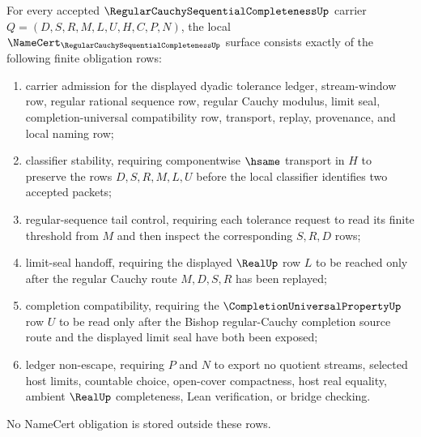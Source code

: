 \begin{theorem}
\label{thm:regular-cauchy-sequential-completeness-namecert-obligations}
For every accepted $\RegularCauchySequentialCompletenessUp$ carrier $Q=(D,S,R,M,L,U,H,C,P,N)$, the local $\NameCert_{\RegularCauchySequentialCompletenessUp}$ surface consists exactly of the following finite obligation rows:
\begin{enumerate}
\item carrier admission for the displayed dyadic tolerance ledger, stream-window row, regular rational sequence row, regular Cauchy modulus, limit seal, completion-universal compatibility row, transport, replay, provenance, and local naming row;
\item classifier stability, requiring componentwise $\hsame$ transport in $H$ to preserve the rows $D,S,R,M,L,U$ before the local classifier identifies two accepted packets;
\item regular-sequence tail control, requiring each tolerance request to read its finite threshold from $M$ and then inspect the corresponding $S,R,D$ rows;
\item limit-seal handoff, requiring the displayed $\RealUp$ row $L$ to be reached only after the regular Cauchy route $M,D,S,R$ has been replayed;
\item completion compatibility, requiring the $\CompletionUniversalPropertyUp$ row $U$ to be read only after the Bishop regular-Cauchy completion source route and the displayed limit seal have both been exposed;
\item ledger non-escape, requiring $P$ and $N$ to export no quotient streams, selected host limits, countable choice, open-cover compactness, host real equality, ambient $\RealUp$ completeness, Lean verification, or bridge checking.
\end{enumerate}
No NameCert obligation is stored outside these rows.
\end{theorem}
